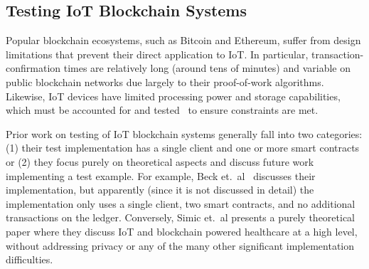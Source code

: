 

\subsection{Testing IoT Blockchain Systems}


Popular blockchain ecosystems, such as Bitcoin and Ethereum, suffer from design limitations that prevent their direct application to IoT. In particular, transaction-confirmation times are relatively long (around tens of minutes) and variable on public blockchain networks due largely to their proof-of-work algorithms. Likewise, IoT devices have limited processing power and storage capabilities, which must be accounted for and tested~\cite{IoTandBl20:online} to ensure constraints are met.

Prior work on testing of IoT blockchain systems generally fall into two categories: (1) their test implementation has a single client and one or more smart contracts or (2) they focus purely on theoretical aspects and discuss future work implementing a test example. For example, Beck et.\ al~\cite{beck2016blockchain} discusses their implementation, but apparently (since it is not discussed in detail) the implementation only uses a single client, two smart contracts, and no additional transactions on the ledger. Conversely, Simic et.\ al \cite{simicCaseStudyIoTBlockchainHealthcare2017}  presents a purely theoretical paper where they discuss IoT and blockchain powered healthcare at a high level, without addressing privacy or any of the many other significant implementation difficulties. 

